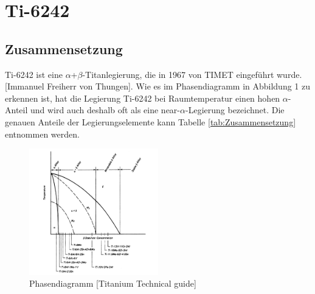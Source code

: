 

\section{Ti-6242}

\subsection{Zusammensetzung}
Ti-6242 ist eine $\alpha$+$\beta$-Titanlegierung, die  in 1967 von TIMET eingeführt wurde. [Immanuel Freiherr von Thungen]. 
Wie es im Phasendiagramm in Abbildung 1 zu erkennen ist, hat die Legierung Ti-6242 bei Raumtemperatur einen hohen $\alpha$-Anteil und wird auch deshalb oft als eine near-$\alpha$-Legierung bezeichnet.
Die genauen Anteile der Legierungselemente kann Tabelle \ref{tab:Zusammensetzung} entnommen werden. 


\begin{figure}[H]
	\centering
	\includegraphics[width=0.5\textwidth]{Bilder/Phasendiagram}
	\caption{Phasendiagramm [Titanium Technical guide]}
	\label{tab:PD-Ti6242}
\end{figure}





